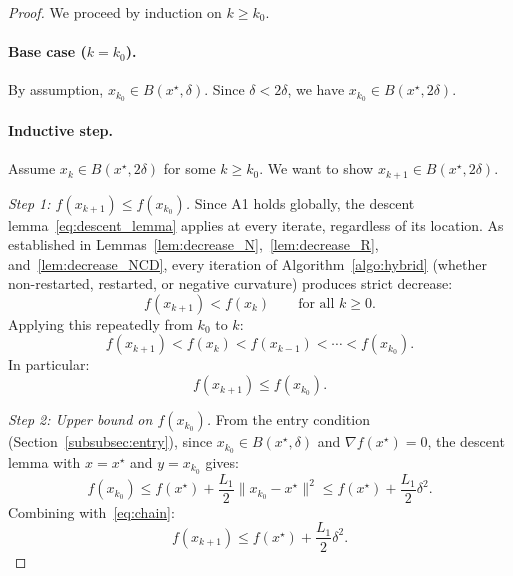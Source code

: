 \documentclass{article}
\begin{document}
\begin{proof}
We proceed by induction on $k \geq k_0$.

\paragraph{Base case ($k = k_0$).} By assumption, $x_{k_0} \in B(x^\star, \delta)$. Since $\delta < 2\delta$, we have $x_{k_0} \in B(x^\star, 2\delta)$.

\paragraph{Inductive step.} Assume $x_k \in B(x^\star, 2\delta)$ for some $k \geq k_0$. We want to show $x_{k+1} \in B(x^\star, 2\delta)$.

\medskip
\emph{Step 1: $f(x_{k+1}) \leq f(x_{k_0})$.} Since A1 holds globally, the descent lemma~\eqref{eq:descent_lemma} applies at every iterate, regardless of its location. As established in Lemmas~\ref{lem:decrease_N},~\ref{lem:decrease_R}, and~\ref{lem:decrease_NCD}, every iteration of Algorithm~\ref{algo:hybrid} (whether non-restarted, restarted, or negative curvature) produces strict decrease:
\[
f(x_{k+1}) < f(x_k) \qquad \text{for all } k \geq 0.
\]
Applying this repeatedly from $k_0$ to $k$:
\[
f(x_{k+1}) < f(x_k) < f(x_{k-1}) < \cdots < f(x_{k_0}).
\]
In particular:
\begin{equation}
\label{eq:chain}
f(x_{k+1}) \leq f(x_{k_0}).
\end{equation}

\medskip
\emph{Step 2: Upper bound on $f(x_{k_0})$.} From the entry condition (Section~\ref{subsubsec:entry}), since $x_{k_0} \in B(x^\star, \delta)$ and $\nabla f(x^\star) = 0$, the descent lemma with $x = x^\star$ and $y = x_{k_0}$ gives:
\[
f(x_{k_0}) \leq f(x^\star) + \frac{L_1}{2}\|x_{k_0} - x^\star\|^2 \leq f(x^\star) + \frac{L_1}{2}\delta^2.
\]
Combining with~\eqref{eq:chain}:
\begin{equation}
\label{eq:fk1_bound}
f(x_{k+1}) \leq f(x^\star) + \frac{L_1}{2}\delta^2.
\end{equation}


\end{proof}
\end{document}
